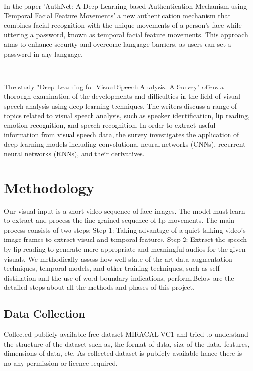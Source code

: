 \documentclass[conference]{IEEEtran}
\begin{document}
\\\par\noindent\hspace{.5cm}In the paper 'AuthNet: A Deep Learning based Authentication Mechanism using Temporal Facial Feature Movements' a new authentication mechanism that combines facial recognition with the unique movements of a person's face while uttering a password, known as temporal facial feature movements. This approach aims to enhance security and overcome language barriers, as users can set a password in any language.

\\\par\noindent\hspace{.5cm}The study "Deep Learning for Visual Speech Analysis: A Survey" offers a thorough examination of the developments and difficulties in the field of visual speech analysis using deep learning techniques. The writers discuss a range of topics related to visual speech analysis, such as speaker identification, lip reading, emotion recognition, and speech recognition. In order to extract useful information from visual speech data, the survey investigates the application of deep learning models including convolutional neural networks (CNNs), recurrent neural networks (RNNs), and their derivatives.
\section{Methodology}
Our visual input is a short video sequence of face images. The model must learn to extract and process the fine grained sequence of lip movements. 
The main process consists of two steps: Step-1: Taking advantage of a quiet talking video's image frames to extract visual and temporal features. Step 2: Extract the speech by lip reading to  generate more appropriate and meaningful audios for the given visuals. 
We methodically assess how well state-of-the-art data augmentation techniques, temporal models, and other training techniques, such as self-distillation and the use of word boundary indications, perform.Below are the detailed steps about all the methods and phases of this project.


\subsection{Data Collection}\label{AA}
Collected publicly available free dataset MIRACAL-VC1 and tried to understand the  structure of the dataset such as, the format of data, size of the data, features, dimensions of data, etc. As collected dataset is publicly available hence there is no any permission or licence required.
\end{document}
